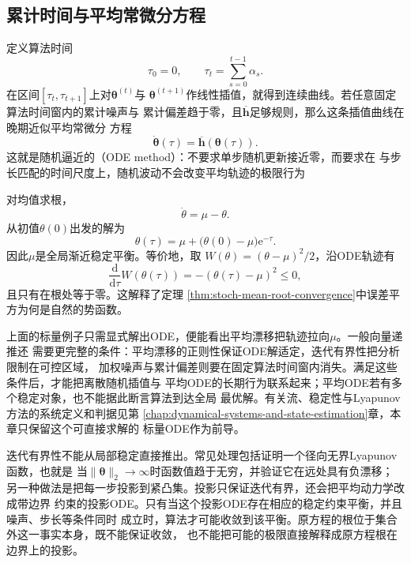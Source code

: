 \subsection{累计时间与平均常微分方程}

定义算法时间
\begin{equation}
  \tau_0=0,\qquad \tau_t=\sum_{s=0}^{t-1}\alpha_s.
  \label{eq:stoch-algorithmic-time}
\end{equation}
在区间$[\tau_t,\tau_{t+1}]$上对$\bm{\theta}^{(t)}$与
$\bm{\theta}^{(t+1)}$作线性插值，就得到连续曲线。若任意固定算法时间窗内的累计噪声与
累计偏差趋于零，且$\overline{\bm{h}}$足够规则，那么这条插值曲线在晚期近似平均常微分
方程
\begin{equation}
  \dot{\bm{\theta}}(\tau)=\overline{\bm{h}}(\bm{\theta}(\tau)).
  \label{eq:stoch-mean-ode}
\end{equation}
这就是随机逼近的（ODE method）：不要求单步随机更新接近零，而要求在
与步长匹配的时间尺度上，随机波动不会改变平均轨迹的极限行为

对均值求根，
\[
  \dot{\theta}=\mu-\theta.
\]
从初值$\theta(0)$出发的解为
\begin{equation}
  \theta(\tau)=\mu+
  \bigl(\theta(0)-\mu\bigr)\mathrm{e}^{-\tau}.
  \label{eq:stoch-mean-root-ode-solution}
\end{equation}
因此$\mu$是全局渐近稳定平衡。等价地，取
$W(\theta)=(\theta-\mu)^2/2$，沿ODE轨迹有
\[
  \frac{\mathrm{d}}{\mathrm{d}\tau}W(\theta(\tau))
  =-(\theta(\tau)-\mu)^2\leq0,
\]
且只有在根处等于零。这解释了定理
\ref{thm:stoch-mean-root-convergence}中误差平方为何是自然的势函数。

上面的标量例子只需显式解出ODE，便能看出平均漂移把轨迹拉向\(\mu\)。一般向量递推还
需要更完整的条件：平均漂移的正则性保证ODE解适定，迭代有界性把分析限制在可控区域，
加权噪声与累计偏差则要在固定算法时间窗内消失。满足这些条件后，才能把离散随机插值与
平均ODE的长期行为联系起来；平均ODE若有多个稳定对象，也不能据此断言算法到达全局
最优解。有关流、稳定性与Lyapunov方法的系统定义和判据见第
\ref{chap:dynamical-systems-and-state-estimation}章，本章只保留这个可直接求解的
标量ODE作为前导。

迭代有界性不能从局部稳定直接推出。常见处理包括证明一个径向无界Lyapunov函数，也就是
当$\lVert\bm{\theta}\rVert_2\to\infty$时函数值趋于无穷，并验证它在远处具有负漂移；
另一种做法是把每一步投影到紧凸集。投影只保证迭代有界，还会把平均动力学改成带边界
约束的投影ODE。只有当这个投影ODE存在相应的稳定约束平衡，并且噪声、步长等条件同时
成立时，算法才可能收敛到该平衡。原方程的根位于集合外这一事实本身，既不能保证收敛，
也不能把可能的极限直接解释成原方程根在边界上的投影。

